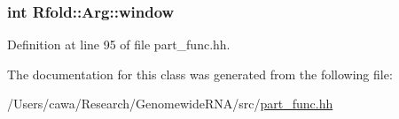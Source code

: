 \hypertarget{class_rfold_1_1_arg_abf6954c2deff613f191b1fae248389f3}{
\subsubsection[{window}]{\setlength{\rightskip}{0pt plus 5cm}int Rfold\+::\+Arg\+::window}}\label{class_rfold_1_1_arg_abf6954c2deff613f191b1fae248389f3}


Definition at line 95 of file part\+\_\+func.\+hh.



The documentation for this class was generated from the following file\+:\begin{DoxyCompactItemize}
\item 
/\+Users/cawa/\+Research/\+Genomewide\+R\+N\+A/src/\hyperlink{part__func_8hh}{part\+\_\+func.\+hh}\end{DoxyCompactItemize}
